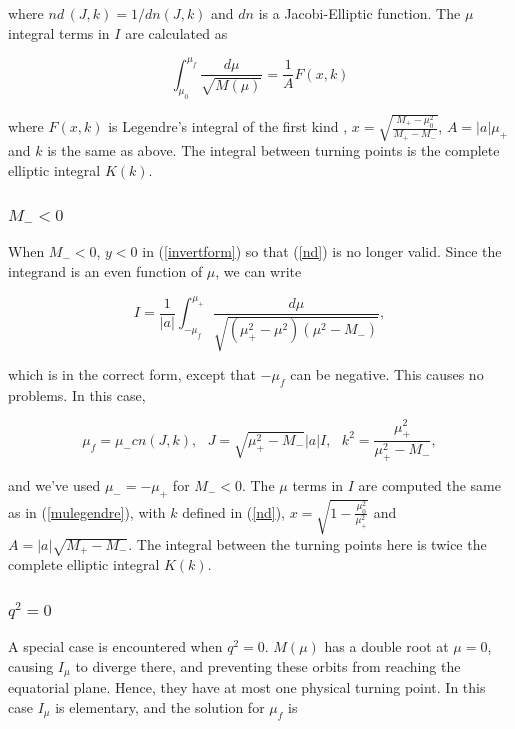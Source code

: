 \documentclass[apj]{emulateapj}
\begin{document}
\noindent where $nd\hspace{2pt}(J,k)=1/dn(J,k)$ and $dn$ is a Jacobi-Elliptic function. The $\mu$ integral terms in $I$ are calculated as

\begin{equation}\label{mulegendre}
\int_{\mu_0}^{\mu_f} \frac{d\mu}{\sqrt{M(\mu)}} = \frac{1}{A} F(x,k) 
\end{equation}

\noindent where $F(x,k)$ is Legendre's integral of the first kind \citep{abramstegun}, $x=\sqrt{\frac{M_+ - \mu_0^2}{M_+ - M_-}}$, $A=\vert a \vert \mu_+$ and $k$ is the same as above. The integral between turning points is the complete elliptic integral $K(k)$.

\subsubsection{$M_- < 0$}

When $M_- < 0$, $y < 0$ in (\ref{invertform}) so that (\ref{nd}) is no longer valid. Since the integrand is an even function of $\mu$, we can write

\begin{equation}
 I = \frac{1}{\vert a \vert}\int_{-\mu_f}^{\mu_+} \frac{d\mu}{\sqrt{(\mu_+^2-\mu^2)(\mu^2-M_-)}},
\end{equation}

\noindent which is in the correct form, except that $-\mu_f$ can be negative. This causes no problems. In this case,

\begin{equation}
 \mu_f = \mu_- cn(J,k),\hspace{8pt} J = \sqrt{\mu_+^2-M_-} \vert a \vert I,\hspace{8pt} k^2 = \frac{\mu_+^2}{\mu_+^2-M_-},
\end{equation}

\noindent and we've used $\mu_-=-\mu_+$ for $M_- < 0$. The $\mu$ terms in $I$ are computed the same as in (\ref{mulegendre}), with $k$ defined in (\ref{nd}), $x=\sqrt{1-\frac{\mu_0^2}{\mu_+^2}}$ and $A=\vert a \vert \sqrt{M_+-M_-}$. The integral between the turning points here is twice the complete elliptic integral $K(k)$.

\subsubsection{$q^2 = 0$}

A special case is encountered when $q^2 = 0$. $M(\mu)$ has a double root at $\mu=0$, causing $I_\mu$ to diverge there, and preventing these orbits from reaching the equatorial plane. Hence, they have at most one physical turning point. In this case $I_\mu$ is elementary, and the solution for $\mu_f$ is
\end{document}
